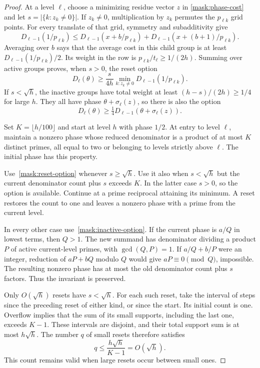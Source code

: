 \begin{proof}
At a level $\ell$, choose a minimizing residue vector $z$ in
\eqref{mask:phase-cost} and let $s=|\{k:z_k\ne0\}|$. If $z_k\ne0$,
multiplication by $z_k$ permutes the $p_{\ell k}$ grid points. For every
translate of that grid, symmetry and subadditivity give
\[
 D_{\ell-1}(1/p_{\ell k})
 \leq D_{\ell-1}(x+b/p_{\ell k})+
       D_{\ell-1}(x+(b+1)/p_{\ell k}).
\]
Averaging over $b$ says that the average cost in this child group is at
least $D_{\ell-1}(1/p_{\ell k})/2$. Its weight in the row is
$p_{\ell k}/t_\ell\geq1/(2h)$. Summing over active groups proves, when
$s>0$, the reset option
\begin{equation}\label{mask:reset-option}
 D_\ell(\theta)\geq\frac{s}{4h}
       \min_{k:z_k\ne0}D_{\ell-1}(1/p_{\ell k}).
\end{equation}
If $s<\sqrt h$, the inactive groups have total weight at least
$(h-s)/(2h)\geq1/4$ for large $h$. They all have phase
$\theta+\sigma_\ell(z)$, so there is also the option
\begin{equation}\label{mask:inactive-option}
 D_\ell(\theta)\geq\tfrac14D_{\ell-1}(\theta+\sigma_\ell(z)).
\end{equation}

Set $K=\lfloor h/100\rfloor$ and start at level $h$ with phase $1/2$.
At entry to level $\ell$, maintain a nonzero phase whose reduced denominator
is a product of at most $K$ distinct primes, all equal to two or belonging
to levels strictly above $\ell$. The initial phase has this property.

Use~\eqref{mask:reset-option} whenever $s\geq\sqrt h$. Use it also when
$s<\sqrt h$ but the current denominator count plus $s$ exceeds $K$.
In the latter case $s>0$, so the option is available. Continue at a prime
reciprocal attaining its minimum. A reset restores the count to one and
leaves a nonzero phase with a prime from the current level.

In every other case use~\eqref{mask:inactive-option}. If the current phase
is $a/Q$ in lowest terms, then $Q>1$. The new summand has denominator
dividing a product $P$ of active current-level primes, with $\gcd(Q,P)=1$.
If $a/Q+b/P$ were an integer, reduction of $aP+bQ$ modulo $Q$ would give
$aP\equiv0\pmod Q$, impossible. The resulting nonzero phase has at most
the old denominator count plus $s$ factors. Thus the invariant is preserved.

Only $O(\sqrt h)$ resets have $s<\sqrt h$. For each such reset, take the
interval of steps since the preceding reset of either kind, or since the
start. Its initial count is one. Overflow implies that the sum of its small
supports, including the last one, exceeds $K-1$. These intervals are
disjoint, and their total support sum is at most $h\sqrt h$. The number $q$
of small resets therefore satisfies
\[
 q\leq\frac{h\sqrt h}{K-1}=O(\sqrt h).
\]
This count remains valid when large resets occur between small ones.


\end{proof}

